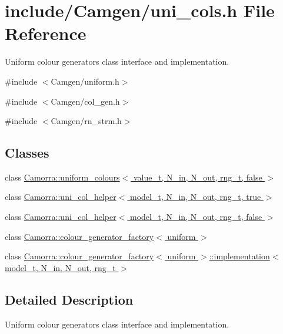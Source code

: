 \hypertarget{a00635}{
\section{include/Camgen/uni\_\-cols.h File Reference}
\label{a00635}
}


Uniform colour generators class interface and implementation.  


{\ttfamily \#include $<$Camgen/uniform.h$>$}\par
{\ttfamily \#include $<$Camgen/col\_\-gen.h$>$}\par
{\ttfamily \#include $<$Camgen/rn\_\-strm.h$>$}\par
\subsection*{Classes}
\begin{DoxyCompactItemize}
\item 
class \hyperlink{a00538}{Camorra::uniform\_\-colours$<$ value\_\-t, N\_\-in, N\_\-out, rng\_\-t, false $>$}
\item 
class \hyperlink{a00534}{Camorra::uni\_\-col\_\-helper$<$ model\_\-t, N\_\-in, N\_\-out, rng\_\-t, true $>$}
\item 
class \hyperlink{a00533}{Camorra::uni\_\-col\_\-helper$<$ model\_\-t, N\_\-in, N\_\-out, rng\_\-t, false $>$}
\item 
class \hyperlink{a00083}{Camorra::colour\_\-generator\_\-factory$<$ uniform $>$}
\item 
class \hyperlink{a00270}{Camorra::colour\_\-generator\_\-factory$<$ uniform $>$::implementation$<$ model\_\-t, N\_\-in, N\_\-out, rng\_\-t $>$}
\end{DoxyCompactItemize}


\subsection{Detailed Description}
Uniform colour generators class interface and implementation. 